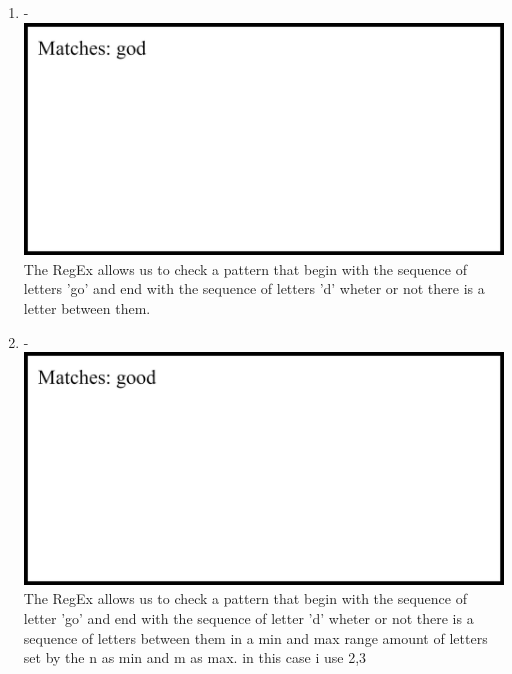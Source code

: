 \documentclass[12pt,titlepage]{article}
\begin{document}
\begin{enumerate}
\begin{enumerate}
        \item - \\ \includegraphics[width=.85\textwidth]{images/figures/fig5.5.png} \\ The RegEx allows us to check a pattern that begin with the sequence of letters 'go' and end with the sequence of letters 'd' wheter or not there is a letter between them.
        \item - \\ \includegraphics[width=.85\textwidth]{images/figures/fig5.6.png} \\ The RegEx allows us to check a pattern that begin with the sequence of letter 'go' and end with the sequence of letter 'd' wheter or not there is a sequence of letters between them in a min and max range amount of letters set by the n as min and m as max. in this case i use {2,3}
    \end{enumerate}

    \newpage


\end{enumerate}
\end{document}
